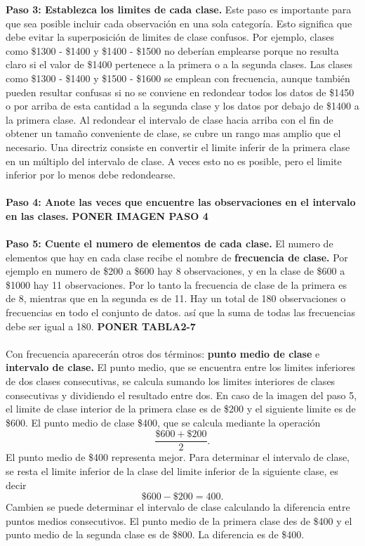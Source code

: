 \documentclass[]{article}
\begin{document}
\textbf{Paso 3: Establezca los limites de cada clase.} Este paso es importante para que sea posible incluir cada observación en una sola categoría. Esto significa que debe evitar la superposición de limites de clase confusos. Por ejemplo, clases como \$1300 - \$1400 y \$1400 - \$1500 no deberían emplearse porque no resulta claro si el valor de \$1400 pertenece a la primera o a la segunda clases. Las clases como \$1300 - \$1400 y \$1500 - \$1600 se emplean con frecuencia, aunque también pueden resultar confusas si no se conviene en redondear todos los datos de \$1450 o por arriba de esta cantidad a la segunda clase y los datos por debajo de \$1400 a la primera clase. Al redondear el intervalo de clase hacia arriba con el fin de obtener un tamaño conveniente de clase, se cubre un rango mas amplio que el necesario. Una directriz consiste en convertir el limite inferir de la primera clase en un múltiplo del intervalo de clase. A veces esto no es posible, pero el limite inferior por lo menos debe redondearse.\\\\
\textbf{Paso 4: Anote las veces que encuentre las observaciones en el intervalo en las clases.}  \textbf{PONER IMAGEN PASO 4}
\\\\\textbf{Paso 5: Cuente el numero de elementos de cada clase.}  El numero de elementos que hay en cada clase recibe el nombre de \textbf{frecuencia de clase.} Por ejemplo en numero de \$200 a \$600 hay 8 observaciones, y en la clase de \$600 a \$1000 hay 11 observaciones. Por lo tanto la frecuencia de clase de la primera es de 8, mientras que en la segunda es de 11. Hay un total de 180 observaciones o frecuencias en todo el conjunto de datos. así que la suma de todas las frecuencias debe ser igual a 180. \textbf{PONER TABLA2-7}\\\\
Con frecuencia aparecerán otros dos términos: \textbf{punto medio de clase} e \textbf{intervalo de clase.} El punto medio, que se encuentra entre los limites inferiores de dos clases consecutivas, se calcula sumando los limites interiores de clases consecutivas y dividiendo el resultado entre dos. En caso de la imagen del paso 5, el limite de clase interior de la primera clase es de \$200 y el siguiente limite es de \$600. El punto medio de clase \$400, que se calcula mediante la operación \[ \frac{\$600+\$200}{2} .\] El punto medio de \$400 representa mejor. Para determinar el intervalo de clase, se resta el limite inferior de la clase del limite inferior de la siguiente clase, es decir \[ \$600 -\$200 =400.\]Cambien se puede determinar el intervalo de clase calculando la diferencia entre puntos medios consecutivos. El punto medio de la primera clase des de \$400 y el punto medio de la segunda clase es de \$800. La diferencia es de \$400.
\end{document}
